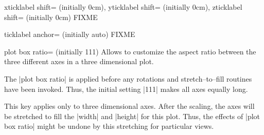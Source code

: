 \begin{pgfplotskeylist}{%
	xticklabel shift= (initially 0cm),%
	yticklabel shift= (initially 0cm),%
	zticklabel shift= (initially 0cm)}
	FIXME
\end{pgfplotskeylist}

\begin{pgfplotsxykey}{\x ticklabel anchor= (initially auto)}
	FIXME
\end{pgfplotsxykey}

\begin{pgfplotskey}{plot box ratio= (initially {1}{1}{1})}
	Allows to customize the aspect ratio between the three different axes in a three dimensional plot.

	The |plot box ratio| is applied before any rotations and stretch--to--fill routines have been invoked. Thus, the initial setting |{1}{1}{1}| makes all axes equally long.

\pgfplotsexpensiveexample
\begin{codeexample}[]
\end{codeexample}

\pgfplotsexpensiveexample
\begin{codeexample}[]
\end{codeexample}

	This key applies only to three dimensional axes. After the scaling, the axes will be stretched to fill the |width| and |height| for this plot. Thus, the effects of |plot box ratio| might be undone by this stretching for particular views.
\end{pgfplotskey}

